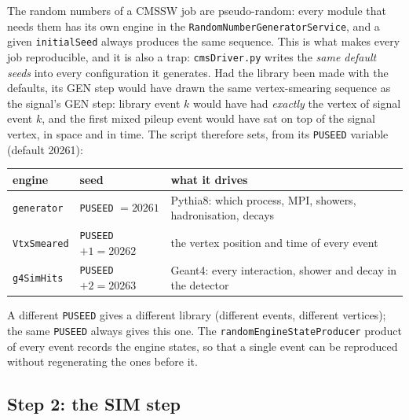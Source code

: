\documentclass[11pt,a4paper]{article}
\newcommand{\code}[1]{\texttt{#1}}
\begin{document}
The random numbers of a CMSSW job are pseudo-random: every module that needs them has its own engine in the
\code{RandomNumberGeneratorService}, and a given \code{initialSeed} always produces the same sequence. This is
what makes every job reproducible, and it is also a trap: \code{cmsDriver.py} writes the \emph{same default
seeds} into every configuration it generates. Had the library been made with the defaults, its GEN step would
have drawn the same vertex-smearing sequence as the signal's GEN step: library event $k$ would have had
\emph{exactly} the vertex of signal event $k$, and the first mixed pileup event would have sat on top of the
signal vertex, in space and in time. The script therefore sets, from its \code{PUSEED} variable (default
20261):
\begin{center}\small
\begin{tabular}{lll}
\toprule
engine & seed & what it drives \\
\midrule
\code{generator} & \code{PUSEED} $=20261$ & Pythia8: which process, MPI, showers, hadronisation, decays \\
\code{VtxSmeared} & \code{PUSEED}$+1 = 20262$ & the vertex position and time of every event \\
\code{g4SimHits} & \code{PUSEED}$+2 = 20263$ & Geant4: every interaction, shower and decay in the detector \\
\bottomrule
\end{tabular}
\end{center}
A different \code{PUSEED} gives a different library (different events, different vertices); the same
\code{PUSEED} always gives this one. The \code{randomEngineStateProducer} product of every event records the
engine states, so that a single event can be reproduced without regenerating the ones before it.

\subsection{Step 2: the SIM step}
\label{sec:simstep}
\end{document}
